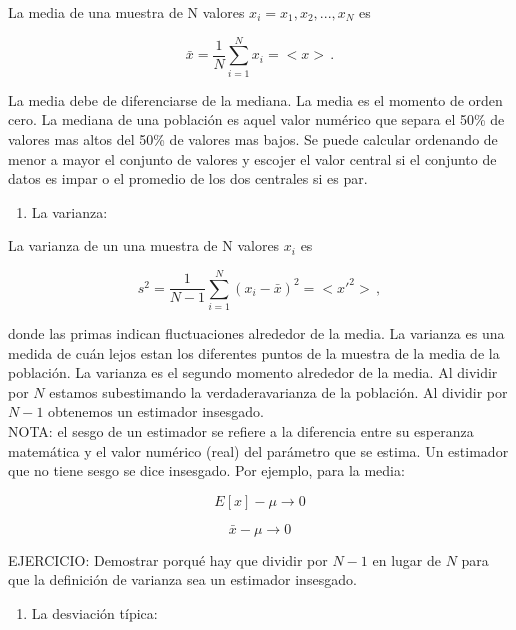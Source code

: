\documentclass[
]{agujournal2019}
\providecommand{\tightlist}{%
  \setlength{\itemsep}{0pt}\setlength{\parskip}{0pt}}\usepackage{longtable,booktabs,array}
\begin{document}
La media de una muestra de N valores \(x_i=x_1,x_2,...,x_N\) es

\begin{equation}
\bar{x}=\frac{1}{N}\sum^N_{i=1}x_i=<x>\,.
\end{equation}

La media debe de diferenciarse de la mediana. La media es el momento de
orden cero. La mediana de una población es aquel valor numérico que
separa el 50\% de valores mas altos del 50\% de valores mas bajos. Se
puede calcular ordenando de menor a mayor el conjunto de valores y
escojer el valor central si el conjunto de datos es impar o el promedio
de los dos centrales si es par.\\

\begin{enumerate}
\def\labelenumi{\arabic{enumi}.}
\setcounter{enumi}{1}
\tightlist
\item
  La varianza:\\
\end{enumerate}

La varianza de un una muestra de N valores \(x_i\) es

\begin{equation}
s^2=\frac{1}{N-1}\sum^N_{i=1}(x_i-\bar{x})^2=<x'^2>\,,
\end{equation}

donde las primas indican fluctuaciones alrededor de la media. La
varianza es una medida de cuán lejos estan los diferentes puntos de la
muestra de la media de la población. La varianza es el segundo momento
alrededor de la media. Al dividir por \(N\) estamos subestimando la
verdaderavarianza de la población. Al dividir por \(N-1\) obtenemos un
estimador insesgado.\\

NOTA: el sesgo de un estimador se refiere a la diferencia entre su
esperanza matemática y el valor numérico (real) del parámetro que se
estima. Un estimador que no tiene sesgo se dice insesgado. Por ejemplo,
para la media:

\[E[x]-\mu \rightarrow {0}\]

\[\bar{x}-\mu \rightarrow {0}\]

EJERCICIO: Demostrar porqué hay que dividir por \(N-1\) en lugar de
\(N\) para que la definición de varianza sea un estimador insesgado.\\

\begin{enumerate}
\def\labelenumi{\arabic{enumi}.}
\setcounter{enumi}{2}
\tightlist
\item
  La desviación típica:\\
\end{enumerate}
\end{document}
